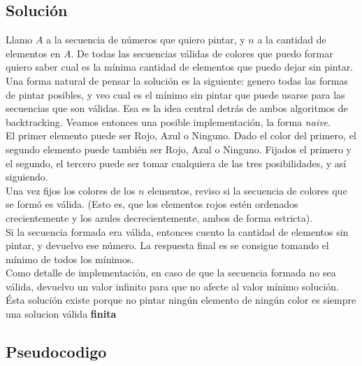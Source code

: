 \subsection{Solución}

Llamo $A$ a la secuencia de números que quiero pintar, y $n$ a la cantidad de elementos en $A$. De todas las secuencias válidas de colores que puedo formar quiero saber cual es la mínima cantidad de elementos que puedo dejar sin pintar. \\

Una forma natural de pensar la solución es la siguiente: genero todas las formas de pintar posibles, y veo cual es el mínimo sin pintar que puede usarse para las secuencias que son válidas. Esa es la idea central detrás de ambos algoritmos de backtracking. Veamos entonces una posible implementación, la forma \textit{naive}. \\

El primer elemento puede ser Rojo, Azul o Ninguno. Dado el color del primero, el segundo elemento puede también ser Rojo, Azul o Ninguno. Fijados el primero y el segundo, el tercero puede ser tomar cualquiera de las tres posibilidades, y así siguiendo. \\

Una vez fijos los colores de los $n$ elementos, reviso si la secuencia de colores que se formó es válida. (Esto es, que los elementos rojos estén ordenados crecientemente y los azules decrecientemente, ambos de forma estricta). \\

Si la secuencia formada era válida, entonces cuento la cantidad de elementos sin pintar, y devuelvo ese número. La respuesta final es se consigue tomando el mínimo de todos los mínimos. \\

Como detalle de implementación, en caso de que la secuencia formada no sea válida, devuelvo un valor infinito para que no afecte al valor mínimo solución. Ésta solución existe porque no pintar ningún elemento de ningún color es siempre una solucion válida \textbf{finita}


\subsection{Pseudocodigo}

